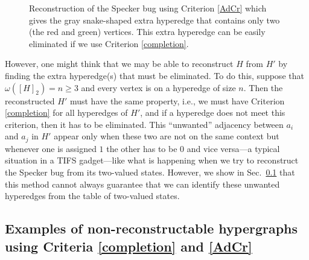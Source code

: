 \documentclass[%
12pt,
prereprint,
showpacs,
showkeys,
preprintnumbers,
amsmath,amssymb,
aps,
pra,
longbibliography,
notitlepage
]{revtex4-1}
\theoremstyle{definition}
\begin{document}
\begin{figure}
\begin{center}
		\end{center}
		\caption{\label{Spec-Rec}
			Reconstruction of the Specker bug using Criterion \ref{AdCr} which gives the gray snake-shaped extra hyperedge that contains only two (the red and green) vertices. This extra hyperedge can be easily eliminated if we use  Criterion \ref{completion}.
		}
	\end{figure}
	
	
	
	However, one might think that we may be able to reconstruct $H$ from $H'$ by finding the extra hyperedge(s) that must be eliminated. To do this, suppose that $\omega([H]_2 )=n\geq 3$ and every vertex is on a hyperedge of size $n$. Then the reconstructed $H'$ must have the same property, i.e., we must have Criterion \ref{completion} for all hyperedges of $H'$, and if a hyperedge does not meet this criterion, then it has to be eliminated. This ``unwanted'' adjacency between $a_i$ and $a_j$ in $H'$ appear only when these two are not on the same context but whenever one is assigned $1$ the other has to be $0$ and vice versa---a typical situation in a TIFS gadget---like what is happening when we try to reconstruct the Specker bug from its two-valued states. However, we show in Sec.~\ref{Rec-B(H)} that this method cannot always guarantee that we can identify these unwanted hyperedges from the table of two-valued states.
	
	
	\subsection{Examples of non-reconstructable hypergraphs using Criteria \ref{completion} and  \ref{AdCr}}\label{Rec-B(H)}
	
\end{document}
